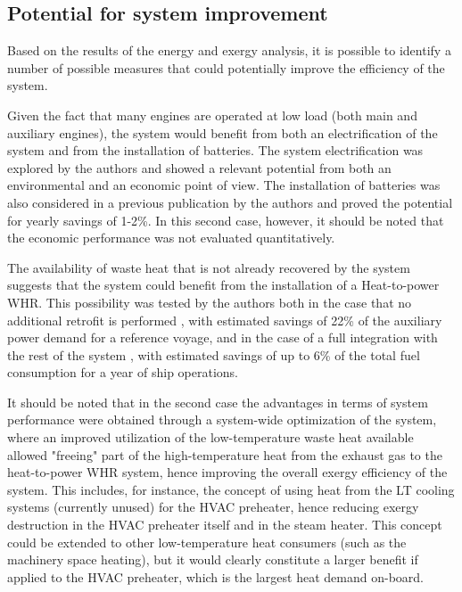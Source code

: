 \documentclass[preprint,12pt]{elsarticle}
\begin{document}
\subsection{Potential for system improvement}

Based on the results of the energy and exergy analysis, it is possible to identify a number of possible measures that could potentially improve the efficiency of the system. 

Given the fact that many engines are operated at low load (both main and auxiliary engines), the system would benefit from both an electrification of the system and from the installation of batteries. The system electrification was explored by the authors \cite{Baldi2016b} and showed a relevant potential from both an environmental and an economic point of view. The installation of batteries was also considered in a previous publication by the authors \cite{Baldi2017} and proved the potential for yearly savings of 1-2\%. In this second case, however, it should be noted that the economic performance was not evaluated quantitatively. 

The availability of waste heat that is not already recovered by the system suggests that the system could benefit from the installation of a Heat-to-power WHR. This possibility was tested by the authors both in the case that no additional retrofit is performed \cite{Mondejar2017,Ahlgren2016}, with estimated savings of 22\% of the auxiliary power demand for a reference voyage, and in the case of a full integration with the rest of the system \cite{Baldi2017}, with estimated savings of up to 6\% of the total fuel consumption for a year of ship operations. 

It should be noted that in the second case the advantages in terms of system performance were obtained through a system-wide optimization of the system, where an improved utilization of the low-temperature waste heat available allowed "freeing" part of the high-temperature heat from the exhaust gas to the heat-to-power WHR system, hence improving the overall exergy efficiency of the system. This includes, for instance, the concept of using heat from the LT cooling systems (currently unused) for the HVAC preheater, hence reducing exergy destruction in the HVAC preheater itself and in the steam heater. This concept could be extended to other low-temperature heat consumers (such as the machinery space heating), but it would clearly constitute a larger benefit if applied to the HVAC preheater, which is the largest heat demand on-board. 
\end{document}
